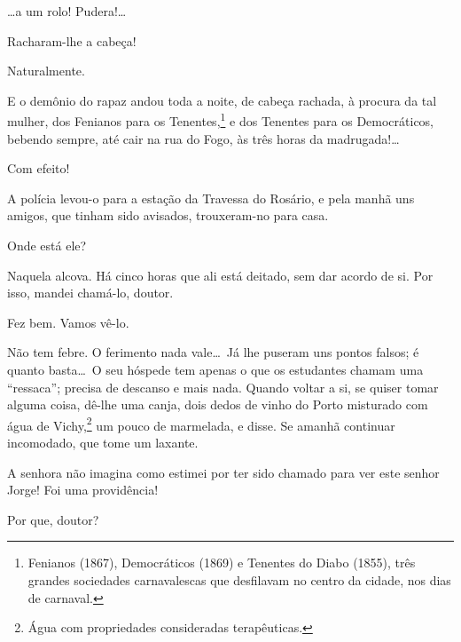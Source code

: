  \ldots a um rolo! Pudera!\ldots

 Racharam{}-lhe a cabeça!

 Naturalmente.

 E o demônio do rapaz andou toda a noite, de cabeça
rachada, à procura da tal mulher, dos Fenianos para os Tenentes,\footnote{
Fenianos (1867), Democráticos (1869) e Tenentes do Diabo (1855), três grandes
sociedades carnavalescas que desfilavam no centro da cidade, nos dias de
carnaval.} e dos
Tenentes para os Democráticos, bebendo sempre, até cair na rua do Fogo,
às três horas da madrugada!\ldots

 Com efeito!

 A polícia levou{}-o para a estação da Travessa do Rosário, e
pela manhã uns amigos, que tinham sido avisados, trouxeram{}-no para
casa.

 Onde está ele?

 Naquela alcova. Há cinco horas que ali está deitado, sem
dar acordo de si. Por isso, mandei chamá{}-lo, doutor.

 Fez bem. Vamos vê{}-lo. 



  Não tem febre.
 O ferimento nada vale\ldots\ Já
lhe puseram uns pontos falsos; é quanto basta\ldots\ O seu hóspede tem
apenas o que os estudantes chamam uma “ressaca”; precisa de descanso e
mais nada. Quando voltar a si, se quiser tomar alguma coisa, dê{}-lhe uma
canja, dois dedos de vinho do Porto misturado com água de
Vichy,\footnote{ Água com propriedades consideradas terapêuticas.} 
um pouco de marmelada, e disse. Se amanhã continuar
incomodado, que tome um laxante.



  A senhora não imagina como
estimei por ter sido chamado para ver este senhor Jorge! Foi uma
providência!

 Por que, doutor?


